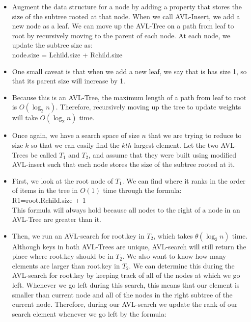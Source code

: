 \documentclass[12pt,twoside]{article}
\begin{document}
\begin{problems}
\begin{problemparts}
\bigskip

\problempart 

\begin{itemize}

\item Augment the data structure for a node by adding a property that stores the size of the subtree rooted at that node. When we call AVL-Insert, we add a new node as a leaf. We can move up the AVL-Tree on a path from leaf to root by recursively moving to the parent of each node. At each node, we update the subtree size as:\\

node.size = Lchild.size + Rchild.size \\

\item One small caveat is that when we add a new leaf, we say that is has size 1, so that its parent size will increase by 1.

\item Because this is an AVL-Tree, the maximum length of a path from leaf to root is $O(\log_2 n)$. Therefore, recursively moving up the tree to update weights will take $O(\log_2 n)$ time.
\end{itemize}
\bigskip

\problempart 

\begin{itemize}
\item Once again, we have a search space of size $n$ that we are trying to reduce to size $k$ so that we can easily find the $kth$ largest element. Let the two AVL-Trees be called $T_1$ and $T_2$, and assume that they were built using modified AVL-insert such that each node stores the size of the subtree rooted at it.

\item First, we look at the root node of $T_1$. We can find where it ranks in the order of items in the tree in $O(1)$ time through the formula: \\

R1=root.Rchild.size + 1 \\

This formula will always hold because all nodes to the right of a node in an AVL-Tree are greater than it.

\item Then, we run an AVL-search for root.key in $T_2$, which takes $\theta(\log_2 n)$ time. Although keys in both AVL-Trees are unique, AVL-search will still return the place where root.key should be in $T_2$. We also want to know how many elements are larger than root.key in $T_2$. We can determine this during the AVL-search for root.key by keeping track of all of the nodes at which we go left. Whenever we go left during this search, this means that our element is smaller than current node and all of the nodes in the right subtree of the current node. Therefore, during our AVL-search we update the rank of our search element whenever we go left by the formula:\\


\end{itemize}
\end{problemparts}
\end{problems}
\end{document}
